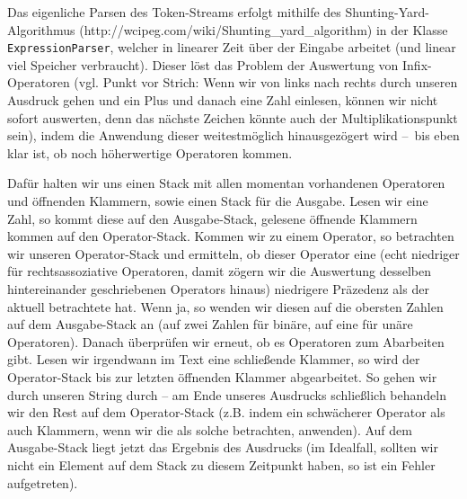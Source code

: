 Das eigenliche Parsen des Token-Streams erfolgt mithilfe des
Shunting-Yard-Algorithmus (http://wcipeg.com/wiki/Shunting_yard_algorithm) in
der Klasse \texttt{ExpressionParser}, welcher in linearer Zeit über der Eingabe
arbeitet (und linear viel Speicher verbraucht). Dieser löst das Problem der
Auswertung von Infix-Operatoren (vgl. Punkt vor Strich: Wenn wir von links nach
rechts durch unseren Ausdruck gehen und ein Plus und danach eine Zahl einlesen,
können wir nicht sofort auswerten, denn das nächste Zeichen könnte auch der
Multiplikationspunkt sein), indem die Anwendung dieser weitestmöglich
hinausgezögert wird – bis eben klar ist, ob noch höherwertige Operatoren kommen.

Dafür halten wir uns einen Stack mit allen momentan vorhandenen Operatoren und
öffnenden Klammern, sowie einen Stack für die Ausgabe. Lesen wir eine Zahl, so
kommt diese auf den Ausgabe-Stack, gelesene öffnende Klammern kommen auf den
Operator-Stack. Kommen wir zu einem Operator, so betrachten wir unseren
Operator-Stack und ermitteln, ob dieser Operator eine (echt niedriger für
rechtsassoziative Operatoren, damit zögern wir die Auswertung desselben
hintereinander geschriebenen Operators hinaus) niedrigere Präzedenz als der
aktuell betrachtete hat. Wenn ja, so wenden wir diesen auf die obersten Zahlen
auf dem Ausgabe-Stack an (auf zwei Zahlen für binäre, auf eine für unäre
Operatoren). Danach überprüfen wir erneut, ob es Operatoren zum Abarbeiten gibt.
Lesen wir irgendwann im Text eine schließende Klammer, so wird der
Operator-Stack bis zur letzten öffnenden Klammer abgearbeitet. So gehen wir
durch unseren String durch – am Ende unseres Ausdrucks schließlich behandeln wir
den Rest auf dem Operator-Stack (z.B. indem ein schwächerer Operator als auch
Klammern, wenn wir die als solche betrachten, anwenden). Auf dem Ausgabe-Stack
liegt jetzt das Ergebnis des Ausdrucks (im Idealfall, sollten wir nicht ein
Element auf dem Stack zu diesem Zeitpunkt haben, so ist ein Fehler aufgetreten).

